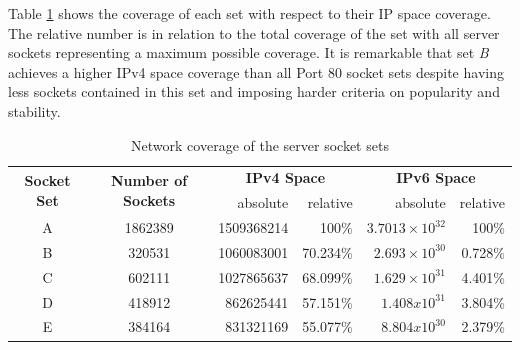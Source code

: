 Table \ref{tab:ses_sets_coverage} shows the coverage of each set with respect to 
their IP space coverage. The relative number is in relation to the total 
coverage of the set with all server sockets representing a maximum possible 
coverage. It is remarkable that set \emph{B} achieves a higher IPv4 space 
coverage than all Port 80 socket sets despite having less sockets contained in 
this set and imposing harder criteria on popularity and stability.  

\begin{table}
	[ht] \centering
	\begin{tabular}
		{|c|c|r|r|r|r|} \hline \multirow{2}{*}{\textbf{Socket Set}} & \multirow{2}{*}{\textbf{Number of Sockets}} & \multicolumn{2}{|c|}{\textbf{IPv4 Space}} & \multicolumn{2}{|c|}{\textbf{IPv6 Space}} \\
	\cline{3-6} & & absolute & relative & absolute & relative \\
		\hline A & 1862389 & 1509368214 & 100\% & $3.7013×10^{32}$ & 100\% \\
		\hline B & 320531  & 1060083001 & 70.234\% & $2.693×10^{30}$ & 0.728\% \\
		\hline C & 602111  & 1027865637 & 68.099\% & $1.629×10^{31}$ & 4.401\% \\
		\hline D & 418912  & 862625441  & 57.151\% & $1.408x10^{31}$ & 3.804\% \\
		\hline E & 384164  & 831321169  & 55.077\% & $8.804x10^{30}$ & 2.379\% \\
		\hline 
	\end{tabular}
	\caption{Network coverage of the server socket sets}
	\label{tab:ses_sets_coverage}
\end{table}

